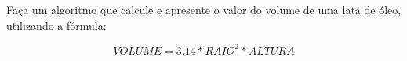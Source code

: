 
Faça um algoritmo que calcule e apresente o valor do volume de uma lata de óleo, utilizando a fórmula:

\begin{equation}
	VOLUME = 3.14 * RAIO^2*ALTURA
\end{equation}
